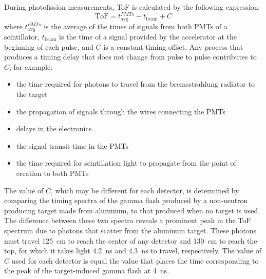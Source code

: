 During photofission measurements, ToF is calculated by the following expression:
\begin{displaymath}
\text{ToF} = t^{PMTs}_{\text{avg}} - t_{\text{beam}} + C
\end{displaymath}
where $t^{PMTs}_{\text{avg}}$ is the average of the times of signals from both PMTs of a scintillator, $t_{\text{beam}}$ is the time of a signal provided by the accelerator at the beginning of each pulse, and $C$ is a constant timing offset.
Any process that produces a timing delay that does not change from pulse to pulse contributes to $C$, for example: \begin{itemize}
\item the time required for photons to travel from the bremsstrahlung radiator to the target
\item the propagation of signals through the wires connecting the PMTs
\item delays in the electronics
\item the signal transit time in the PMTs
\item the time required for scintillation light to propagate from the point of creation to both PMTs
\end{itemize}

The value of $C$, which may be different for each detector, is determined by comparing the timing spectra of the gamma flash produced by a non-neutron producing target made from aluminum, to that produced when no target is used.
The difference between these two spectra reveals a prominent peak in the ToF spectrum due to photons that scatter from the aluminum target.
These photons must travel 125~cm to reach the center of any detector and 130~cm to reach the top, for which it takes light 4.2~ns and 4.3~ns to travel, respectively.
The value of $C$ used for each detector is equal the value that places the time corresponding to the peak of the target-induced gamma flash at 4~ns.

